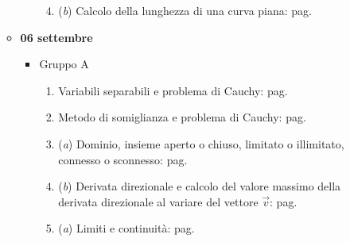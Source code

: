 \documentclass[a4paper]{article}
\begin{document}
\begin{itemize}
\begin{itemize}
\begin{itemize}
\begin{enumerate}[label*=Ex. \arabic*), leftmargin = 4em]
					\setcounter{enumi}{3}
					
					\item (\emph{b}) Calcolo della lunghezza di una curva piana: pag.~\hyperlink{
						exam: esame 10 luglio 2023 - Gruppo A - 4 esercizio (b)
					}{
					}
				\end{enumerate}
			\end{itemize}

			\item \textbf{06 settembre}
			\begin{itemize}
				\item Gruppo A
				\begin{enumerate}[label*=Ex. \arabic*), leftmargin = 4em]
					\item Variabili separabili e problema di Cauchy: pag.~\hyperlink{
						exam: esame 06 settembre 2023 - Gruppo A - 1 esercizio
					}{
					}
					
					\item Metodo di somiglianza e problema di Cauchy: pag.~\hyperlink{
						exam: esame 06 settembre 2023 - Gruppo A - 2 esercizio
					}{
					}
					
					\item (\emph{a}) Dominio, insieme aperto o chiuso, limitato o illimitato, connesso o sconnesso: pag.~\hyperlink{
						exam: esame 06 settembre 2023 - Gruppo A - 3 esercizio (a)
					}{
					}

					\setcounter{enumi}{2}
					
					\item (\emph{b}) Derivata direzionale e calcolo del valore massimo della derivata direzionale al variare del vettore $\overrightarrow{v}$: pag.
					\hyperlink{
						exam: esame 06 settembre 2023 - Gruppo A - 3 esercizio (b)
					}{
					}
					
					\item (\emph{a}) Limiti e continuità: pag.~\hyperlink{
						exam: esame 06 settembre 2023 - Gruppo A - 4 esercizio (a)
					}{
					}

					\setcounter{enumi}{3}
					

\end{enumerate}
\end{itemize}
\end{itemize}
\end{itemize}
\end{document}
